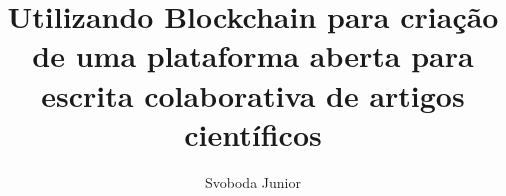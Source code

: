 \documentclass[ppgc,pep]{iiufrgs}
\title{Utilizando Blockchain para criação de uma plataforma aberta para escrita colaborativa de artigos científicos}
\author{Svoboda Junior}{Luiz Hermes}
\begin{document}
\maketitle




\tableofcontents








\label{LastPage}
\end{document}
